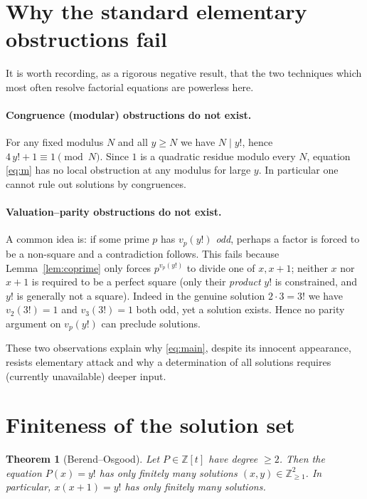 \documentclass{amsart}
\theoremstyle{plain}
\newtheorem{theorem}{Theorem}
\theoremstyle{remark}
\begin{document}
\section{Why the standard elementary obstructions fail}\label{sec:obstruction}

It is worth recording, as a rigorous negative result, that the two
techniques which most often resolve factorial equations are powerless here.

\paragraph{Congruence (modular) obstructions do not exist.}
For any fixed modulus $N$ and all $y\ge N$ we have $N\mid y!$, hence
$4\,y!+1\equiv 1\pmod{N}$.  Since $1$ is a quadratic residue modulo every
$N$, equation \eqref{eq:m} has no local obstruction at any modulus for
large $y$.  In particular one cannot rule out solutions by congruences.

\paragraph{Valuation--parity obstructions do not exist.}
A common idea is: if some prime $p$ has $v_p(y!)$ \emph{odd}, perhaps a
factor is forced to be a non-square and a contradiction follows.  This
fails because Lemma~\ref{lem:coprime} only forces $p^{v_p(y!)}$ to divide
one of $x,x+1$; neither $x$ nor $x+1$ is required to be a perfect square
(only their \emph{product} $y!$ is constrained, and $y!$ is generally not a
square).  Indeed in the genuine solution $2\cdot 3=3!$ we have $v_2(3!)=1$
and $v_3(3!)=1$ both odd, yet a solution exists.  Hence no parity argument
on $v_p(y!)$ can preclude solutions.

These two observations explain why \eqref{eq:main}, despite its innocent
appearance, resists elementary attack and why a determination of all
solutions requires (currently unavailable) deeper input.

\section{Finiteness of the solution set}\label{sec:finite}

\begin{theorem}[Berend--Osgood]\label{thm:finite}
Let $P\in\mathbb{Z}[t]$ have degree $\ge 2$.  Then the equation $P(x)=y!$
has only finitely many solutions $(x,y)\in\mathbb{Z}_{\ge 1}^2$.  In
particular, $x(x+1)=y!$ has only finitely many solutions.
\end{theorem}
\end{document}
